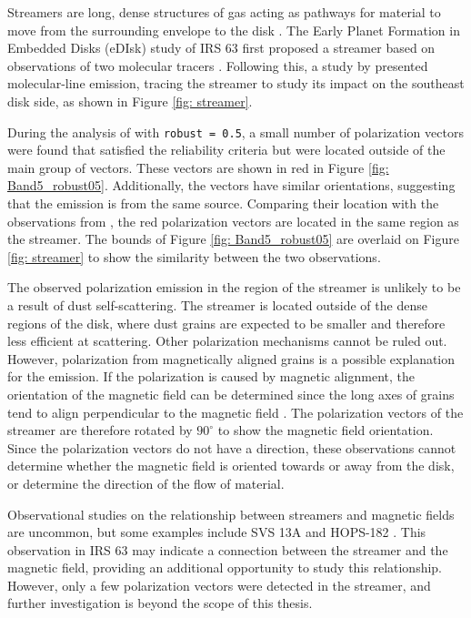 
Streamers are long, dense structures of gas acting as pathways for material to move from the surrounding envelope to the disk \citep{Heigl}. The Early Planet Formation in Embedded Disks (eDIsk) study of IRS 63 first proposed a streamer based on observations of two molecular tracers \citep{Flores}. Following this, a study by \cite{Podio} presented molecular-line emission, tracing the streamer to study its impact on the southeast disk side, as shown in Figure \ref{fig: streamer}. 


 During the analysis of \bfive with \texttt{robust = 0.5}, a small number of polarization vectors were found that satisfied the reliability criteria but were located outside of the main group of vectors. These vectors are shown in red in Figure \ref{fig: Band5_robust05}. Additionally, the vectors have similar orientations, suggesting that the emission is from the same source.  Comparing their location with the observations from \cite{Podio}, the red polarization vectors are located in the same region as the streamer. The bounds of Figure \ref{fig: Band5_robust05} are overlaid on Figure \ref{fig: streamer} to show the similarity between the two observations. 


 
The observed polarization emission in the region of the streamer is unlikely to be a result of dust self-scattering. The streamer is located outside of the dense regions of the disk, where dust grains are expected to be smaller and therefore less efficient at scattering. Other polarization mechanisms cannot be ruled out. However, polarization from magnetically aligned grains is a possible explanation for the emission. If the polarization is caused by magnetic alignment, the orientation of the magnetic field can be determined since the long axes of grains tend to align perpendicular to the magnetic field \citep{Lazarian}. The polarization vectors of the streamer are therefore rotated by $90^\circ$ to show the magnetic field orientation. Since the polarization vectors do not have a direction, these observations cannot determine whether the magnetic field is oriented towards or away from the disk, or determine the direction of the flow of material.




Observational studies on the relationship between streamers and magnetic fields are uncommon, but some examples include SVS 13A \citep{Cort} and HOPS-182 \citep{Huang_2026}. This observation in IRS 63 may indicate a connection between the streamer and the magnetic field, providing an additional opportunity to study this relationship. However, only a few polarization vectors were detected in the streamer, and further investigation is beyond the scope of this thesis.






